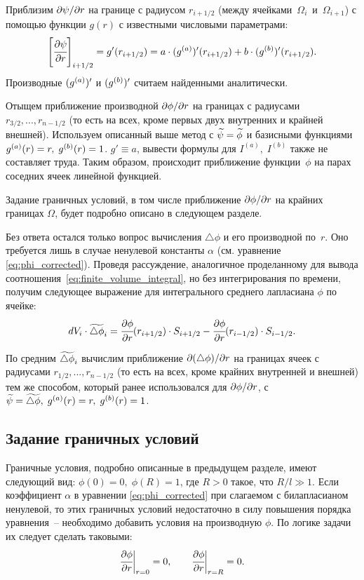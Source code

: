 Приблизим $\partial \psi / \partial r$ на границе с радиусом $r_{i + 1/2}$ (между ячейка\forcehyphenation ми~$\Omega_i$~и~$\Omega_{i + 1}$) с помощью функции $g(r)$ с известными числовыми параметрами:
$$\left[ \cfrac{\partial \psi}{\partial r} \right]_{i + 1/2} = g'(r_{i + 1/2}) = a \cdot ({g^{(a)}})'(r_{i + 1/2}) + b \cdot ({g^{(b)}})'(r_{i + 1/2}) {\text{.}}$$
Производные $({g^{(a)}})'$ и $({g^{(b)}})'$ считаем найденными аналитически.

Отыщем приближение производной $\partial \phi / \partial r$ на границах с радиуса\forcehyphenation ми~$r_{3/2},..., r_{n - 1/2}$ (то есть на всех, кроме первых двух внутренних и крайней внешней). Используем описанный выше метод с ${\widetilde{\psi}} = {\widetilde{\phi}}$ и базисными функциями ${g^{(a)}}(r) = r, \; {g^{(b)}}(r) = 1$. $g' \equiv a$, вывести формулы для $I^{(a)}, \; I^{(b)}$ также не составляет труда. Таким образом, происходит приближение функции~$\phi$ на парах соседних ячеек линейной функцией.

Задание граничных условий, в том числе приближение $\partial \phi / \partial r$ на крайних границах $\Omega$, будет подробно описано в следующем разделе.

Без ответа остался только вопрос вычисления $\triangle \phi$ и его производной по~$r$. Оно требуется лишь в случае ненулевой константы $\alpha$ (см. уравнение \eqref{eq:phi_corrected}). Проведя рассуждение, аналогичное проделанному для вывода соотноше\forcehyphenation ния~\eqref{eq:finite_volume_integral}, но без интегрирования по времени, получим следующее выражение для интегрального среднего лапласиана $\phi$ по ячейке:
\begin{equation}
	dV_i \cdot {\widetilde{\triangle \phi}}_i = \cfrac{\partial \phi}{\partial r} (r_{i + 1/2}) \cdot S_{i + 1/2} - \cfrac{\partial \phi}{\partial r} (r_{i - 1/2}) \cdot S_{i - 1/2} {\text{.}}
	\label{eq:finite_volume_laplasian}
\end{equation}

По средним ${\widetilde{\triangle \phi}}_i$ вычислим приближение $\partial (\triangle \phi) / \partial r$ на границах ячеек с радиусами $r_{1/2}, ..., r_{n - 1/2}$ (то есть на всех, кроме крайних внутренней и внешней) тем же способом, который ранее использовался для $\partial \phi / \partial r$, с $\avpsi \hm = \avlaplphi, \; \ga(r) = r, \; \gb(r) = 1$.


\subsection{Задание граничных условий}

Граничные условия, подробно описанные в предыдущем разделе, имеют следующий вид: $\phi(0) = 0, \; \phi(R) = 1$, где $R > 0$ такое, что $R / l \gg 1$. Если коэффициент $\alpha$ в уравнении \eqref{eq:phi_corrected} при слагаемом с билапласианом ненулевой, то этих граничных условий недостаточно в силу повышения порядка уравнения~-- необходимо добавить условия на производную $\phi$. По логике задачи их следует сделать таковыми:
$$\cfrac{\partial \phi}{\partial r} \bigg|_{r = 0} = 0, \qquad \cfrac{\partial \phi}{\partial r} \bigg|_{r = R} = 0 {\text{.}}$$

